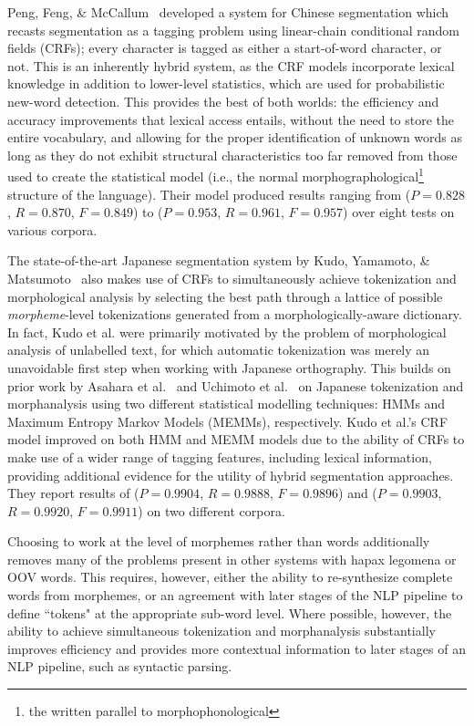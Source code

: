 Peng, Feng, \& McCallum~\cite{peng04} developed a system for Chinese segmentation which recasts segmentation as a tagging problem using linear-chain conditional random fields (CRFs); every character is tagged as either a start-of-word character, or not. This is an inherently hybrid system, as the CRF models incorporate lexical knowledge in addition to lower-level statistics, which are used for probabilistic new-word detection. This provides the best of both worlds: the efficiency and accuracy improvements that lexical access entails, without the need to store the entire vocabulary, and allowing for the proper identification of unknown words as long as they do not exhibit structural characteristics too far removed from those used to create the statistical model (i.e., the normal morphographological\footnote{the written parallel to morphophonological} structure of the language). Their model produced results ranging from ($P = 0.828$, $R = 0.870$, $F = 0.849$) to ($P = 0.953$, $R = 0.961$, $F = 0.957$) over eight tests on various corpora.

The state-of-the-art Japanese segmentation system by Kudo, Yamamoto, \& Matsumoto~\cite{kudo04} also makes use of CRFs to simultaneously achieve tokenization and morphological analysis by selecting the best path through a lattice of possible \textit{morpheme}-level tokenizations generated from a morphologically-aware dictionary. In fact, Kudo et al. were primarily motivated by the problem of morphological analysis of unlabelled text, for which automatic tokenization was merely an unavoidable first step when working with Japanese orthography. This builds on prior work by Asahara et al.~\cite{asahara00} and Uchimoto et al.~\cite{uchimoto01} on Japanese tokenization and morphanalysis using two different statistical modelling techniques: HMMs and Maximum Entropy Markov Models (MEMMs), respectively. Kudo et al.'s CRF model improved on both HMM and MEMM models due to the ability of CRFs to make use of a wider range of tagging features, including lexical information, providing additional evidence for the utility of hybrid segmentation approaches. They report results of ($P = 0.9904$, $R = 0.9888$, $F = 0.9896$) and ($P = 0.9903$, $R = 0.9920$, $F = 0.9911$) on two different corpora.

Choosing to work at the level of morphemes rather than words additionally removes many of the problems present in other systems with hapax legomena or OOV words. This requires, however, either the ability to re-synthesize complete words from morphemes, or an agreement with later stages of the NLP pipeline to define ``tokens" at the appropriate sub-word level. Where possible, however, the ability to achieve simultaneous tokenization and morphanalysis substantially improves efficiency and provides more contextual information to later stages of an NLP pipeline, such as syntactic parsing.

